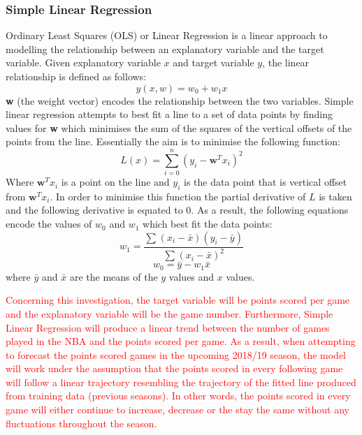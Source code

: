 \documentclass[a4paper,11pt,twoside]{article}
\begin{document}
\subsubsection{Simple Linear Regression}
Ordinary Least Squares (OLS) or Linear Regression is a linear approach to modelling the relationship between an explanatory variable and the target variable.  Given explanatory variable \(x\) and target variable \(y\), the linear relationship is defined as follows:
\begin{equation}
y(x,w) = w_{0} + w_{1}x
\end{equation}
\textbf{w} (the weight vector) encodes the relationship between the two variables. Simple linear regression attempts to best fit a line to a set of data points by finding values for \textbf{w} which minimises the sum of the squares of the vertical offsets of the points from the line. Essentially the aim is to minimise the following function:
\begin{equation}
L(x) = \sum_{i=0}^{n}(y_{i}-\textbf{w}^Tx_{i})^2
\end{equation}
Where $\textbf{w}^Tx_{i}$ is a point on the line  and \(y_i\) is the data point that is vertical offset from  $\textbf{w}^Tx_{i}$. In order to minimise this function the partial derivative of $L$ is taken and the following derivative is equated to 0. As a result, the following equations encode the values of \(w_{0}\) and \(w_{1}\) which best fit the data points:
\begin{equation}
w_{1} =\frac{\sum{}^{} (x_{i} - \bar{x})(y_{i} - \bar{y})}{\sum{}^{}(x_{i} - \bar{x})^2}
\end{equation}
\begin{equation}
w_{0} = \bar{y} - w_{1}\bar{x}
\end{equation}
where $\bar{y}$ and $\bar{x}$  are the means of the $y$ values and $x$ values.

\textcolor{red}{Concerning this investigation, the target variable will be points scored per game and the explanatory variable will be the game number. Furthermore, Simple Linear Regression will produce a linear trend between the number of games played in the NBA and the points scored per game. As a result, when attempting to forecast the points scored games in the upcoming 2018/19 season, the model will work under the assumption that the points scored in every following game will follow a linear trajectory resembling the trajectory of the fitted line produced from training data (previous seasons). In other words, the points scored in every game will either continue to increase, decrease or the stay the same without any fluctuations throughout the season.}
\end{document}
